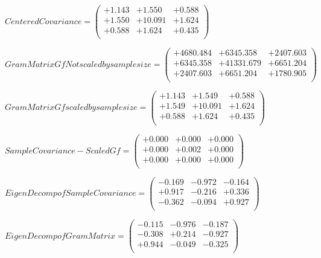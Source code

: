 \documentclass[9pt]{article}
\theoremstyle{plain}
\theoremstyle{definition}
\theoremstyle{remark}
\numberwithin{equation}{section}
\begin{document}
$Centered Covariance = \left(
\begin{array}{
ccc}
+1.143 & +1.550 & +0.588 \\
+1.550 & +10.091 & +1.624 \\
+0.588 & +1.624 & +0.435 \\
\end{array}
\right)$ \newline 

$Gram Matrix Gf Not scaled by sample size = \left(
\begin{array}{
ccc}
+4680.484 & +6345.358 & +2407.603 \\
+6345.358 & +41331.679 & +6651.204 \\
+2407.603 & +6651.204 & +1780.905 \\
\end{array}
\right)$ \newline 

$Gram Matrix Gf  scaled by sample size = \left(
\begin{array}{
ccc}
+1.143 & +1.549 & +0.588 \\
+1.549 & +10.091 & +1.624 \\
+0.588 & +1.624 & +0.435 \\
\end{array}
\right)$ \newline 

$SampleCovariance - Scaled Gf = \left(
\begin{array}{
ccc}
+0.000 & +0.000 & +0.000 \\
+0.000 & +0.002 & +0.000 \\
+0.000 & +0.000 & +0.000 \\
\end{array}
\right)$ \newline 

$EigenDecomp of SampleCovariance = \left(
\begin{array}{
ccc}
-0.169 & -0.972 & -0.164 \\
+0.917 & -0.216 & +0.336 \\
-0.362 & -0.094 & +0.927 \\
\end{array}
\right)$ \newline 

$EigenDecomp of Gram Matrix = \left(
\begin{array}{
ccc}
-0.115 & -0.976 & -0.187 \\
-0.308 & +0.214 & -0.927 \\
+0.944 & -0.049 & -0.325 \\
\end{array}
\right)$ \newline 
\end{document}
